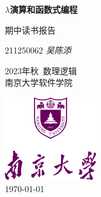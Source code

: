 
\begin{titlepage}
    \begin{center}
        \vspace*{2.7cm}
            
        \Huge
        \textbf{$\lambda$演算和函数式编程}
            
        \vspace{1cm}
        \huge
        期中读书报告
        \vspace{1.5cm}
        \Large
            
        211250062 \textit{吴陈添}\vfill

        2023年秋\ 数理逻辑\\
        南京大学软件学院
        \vspace{1cm}  
    
        \includegraphics[width=0.3\textwidth]{templates/logo-nju.png}\\
        \vspace{1cm}  
        \Large \today
        
    \end{center}
\end{titlepage}
